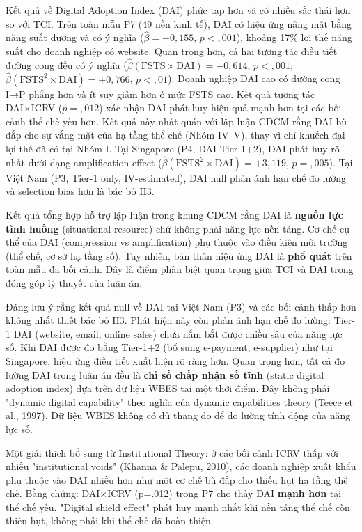 \documentclass[12pt,a4paper]{article}
\begin{document}
Kết quả về Digital Adoption Index (DAI) phức tạp hơn và có nhiều sắc
thái hơn so với TCI. Trên toàn mẫu P7 (49 nền kinh tế), DAI có hiệu ứng
nâng mặt bằng năng suất dương và có ý nghĩa (\(\hat{\beta} = +0{,}155\),
\(p < {,}001\)), khoảng 17\% lợi thế năng suất cho doanh nghiệp có
website. Quan trọng hơn, cả hai tương tác điều tiết đường cong đều có ý
nghĩa (\(\hat{\beta}(\text{FSTS} \times \text{DAI}) = -0{,}614\),
\(p < {,}001\);
\(\hat{\beta}(\text{FSTS}^2 \times \text{DAI}) = +0{,}766\),
\(p < {,}01\)). Doanh nghiệp DAI cao có đường cong I→P phẳng hơn và ít
suy giảm hơn ở mức FSTS cao. Kết quả tương tác DAI×ICRV (\(p = {,}012\))
xác nhận DAI phát huy hiệu quả mạnh hơn tại các bối cảnh thể chế yếu
hơn. Kết quả này nhất quán với lập luận CDCM rằng DAI bù đắp cho sự vắng
mặt của hạ tầng thể chế (Nhóm IV--V), thay vì chỉ khuếch đại lợi thế đã
có tại Nhóm I. Tại Singapore (P4, DAI Tier-1+2), DAI phát huy rõ nhất
dưới dạng amplification effect
(\(\hat{\beta}(\text{FSTS}^2 \times \text{DAI}) = +3{,}119\),
\(p = {,}005\)). Tại Việt Nam (P3, Tier-1 only, IV-estimated), DAI null
phản ánh hạn chế đo lường và selection bias hơn là bác bỏ H3.

Kết quả tổng hợp hỗ trợ lập luận trong khung CDCM rằng DAI là
\textbf{nguồn lực tình huống} (situational resource) chứ không phải năng
lực nền tảng. Cơ chế cụ thể của DAI (compression vs amplification) phụ
thuộc vào điều kiện môi trường (thể chế, cơ sở hạ tầng số). Tuy nhiên,
bản thân hiệu ứng DAI là \textbf{phổ quát} trên toàn mẫu đa bối cảnh.
Đây là điểm phân biệt quan trọng giữa TCI và DAI trong đóng góp lý
thuyết của luận án.

Đáng lưu ý rằng kết quả null về DAI tại Việt Nam (P3) và các bối cảnh
thấp hơn không nhất thiết bác bỏ H3. Phát hiện này còn phản ánh hạn chế
đo lường: Tier-1 DAI (website, email, online sales) chưa nắm bắt được
chiều sâu của năng lực số. Khi DAI được đo bằng Tier-1+2 (bổ sung
e-payment, e-supplier) như tại Singapore, hiệu ứng điều tiết xuất hiện
rõ ràng hơn. Quan trọng hơn, tất cả đo lường DAI trong luận án đều là
\textbf{chỉ số chấp nhận số tĩnh} (static digital adoption index) dựa
trên dữ liệu WBES tại một thời điểm. Đây không phải "dynamic digital
capability" theo nghĩa của dynamic capabilities theory (Teece et al.,
1997). Dữ liệu WBES không có đủ thang đo để đo lường tính động của năng
lực số.

Một giải thích bổ sung từ Institutional Theory: ở các bối cảnh ICRV thấp
với nhiều "institutional voids" (Khanna \& Palepu, 2010), các doanh
nghiệp xuất khẩu phụ thuộc vào DAI nhiều hơn như một cơ chế bù đắp cho
thiếu hụt hạ tầng thể chế. Bằng chứng: DAI×ICRV (p=.012) trong P7 cho
thấy DAI \textbf{mạnh hơn} tại thể chế yếu. "Digital shield effect" phát
huy mạnh nhất khi nền tảng thể chế còn thiếu hụt, không phải khi thể chế
đã hoàn thiện.
\end{document}
